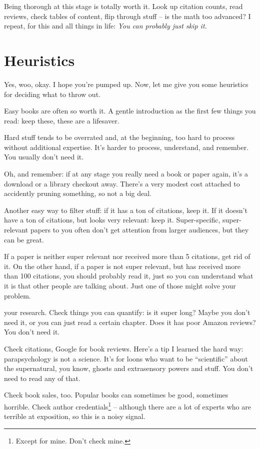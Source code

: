 Being thorough at this stage is totally worth it. Look up citation counts, read
reviews, check tables of content, flip through stuff -- is the math too advanced?
I repeat, for this and all things in life: \textit{You can probably just skip
  it.}

\section{Heuristics}

Yes, woo, okay. I hope you're pumped up. Now, let me give you some heuristics
for deciding what to throw out.

Easy books are often so worth it. A gentle introduction as the first few things
you read: keep these, these are a lifesaver.

Hard stuff tends to be overrated and, at the beginning, too hard to process
without additional expertise. It's harder to process, understand, and
remember. You usually don't need it.

Oh, and remember: if at any stage you really need a book or paper again, it's a
download or a library checkout away. There's a very modest cost attached to
accidently pruning something, so not a big deal.

Another easy way to filter stuff: if it has a ton of citations, keep it. If it
doesn't have a ton of citations, but looks very relevant: keep
it. Super-specific, super-relevant papers to you often don't get attention from
larger audiences, but they can be great.

If a paper is neither super relevant nor received more than 5 citations, get rid
of it. On the other hand, if a paper is not super relevant, but has received
more than 100 citations, you should probably read it, just so you can understand
what it is that other people are talking about. Just one of those might solve
your problem.

 your research. Check things you can quantify: is it
super long? Maybe you don't need it, or you can just read a certain
chapter. Does it has poor Amazon reviews? You don't need it.

Check citations, Google for book reviews. Here's a tip I learned the hard way:
parapsychology is not a science. It's for loons who want to be ``scientific'' about the supernatural, you know, ghosts and extrasensory powers and
stuff. You don't need to read any of that.

Check book sales, too. Popular books can sometimes be good, sometimes
horrible. Check author credentials\footnote{Except for mine. Don't check mine.} -- although there are a lot of experts who
are terrible at exposition, so this is a noisy signal. 

